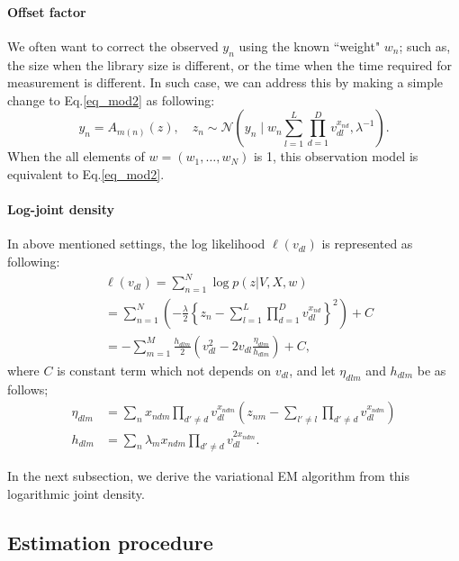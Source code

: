 \documentclass[a4paper,12ptc]{jsarticle} %
\newcommand{\normal}{\mathcal{N}}
\newcommand{\C}{C}
\begin{document}
\paragraph{Offset factor}
We often want to correct the observed $y_n$ using the known ``weight" $w_n$; such as, the size when the library size is different, or the time when the time required for measurement is different.
In such case, we can address this by making a simple change to Eq.\ref{eq_mod2} as following:
\begin{equation}
y_n = A_{m(n)}(z), \quad z_n\sim \normal\left(y_n \mid w_n \sum_{l=1}^L \prod_{d=1}^D v_{dl}^{x_{nd}}, \lambda^{-1}\right).\label{eq_mod_off}
\end{equation}
When the all elements of $w=(w_1, \ldots , w_N)$ is 1, this observation model is equivalent to Eq.\ref{eq_mod2}.

\paragraph{Log-joint density}
In above mentioned settings, the log likelihood $\ell(v_{dl})$ is represented as following:
\begin{align*}
& \ell(v_{dl}) =\sum_{n=1}^{N} \log p(z|V, X, w)\\
&= \sum_{n=1}^{N}\left(-\frac{\lambda}{2}\left\{ z_n -\sum_{l=1}^L\prod_{d=1}^D v_{dl}^{x_{nd}} \right\}^2\right)+ \C\\
&= -\sum_{m=1}^M\frac{h_{dlm}}{2}\left(v_{dl}^2-2v_{dl}\frac{\eta_{dlm}}{h_{dlm}}\right) +C,
\end{align*}
where $C$ is constant term which not depends on $v_{dl}$, and let $\eta_{dlm}$ and $h_{dlm}$ be as follows;
\begin{align}
\eta_{dlm} &= \sum_n x_{ndm} \prod_{d' \neq d} v_{dl}^{x_{ndm}}\left( z_{nm} - \sum_{l'\neq l} \prod_{d' \neq d} v_{dl}^{x_{ndm}} \right) \label{eq_eta}\\
h_{dlm} &= \sum_n \lambda_m x_{ndm} \prod_{d' \neq d} v_{dl}^{2x_{ndm}}. \label{eq_h}
\end{align}

In the next subsection, we derive the variational EM algorithm from this logarithmic joint density.

\subsection{Estimation procedure}
\label{est_sec}
\end{document}
